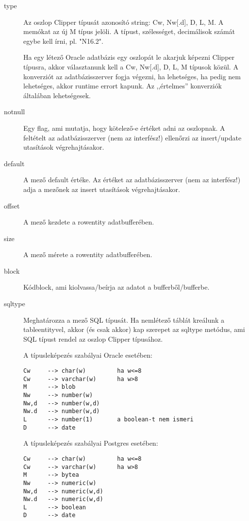 \begin{description}
\item[type]
    Az oszlop Clipper típusát azonosító string:  Cw, Nw[.d], D, L, M.
    A memókat az új M típus jelöli. A típust, szélességet, decimálisok
    számát egybe kell írni, pl. "N16.2".

    Ha egy létező Oracle adatbázis egy oszlopát le akarjuk
    képezni Clipper típusra, akkor választanunk kell a 
    Cw, Nw[.d], D, L, M típusok közül. A konverziót az adatbázisszerver
    fogja végezni, ha lehetséges, ha pedig nem lehetséges, 
    akkor runtime errort kapunk. Az ,,értelmes'' konverziók általában 
    lehetségesek.

\item[notnull]
    Egy flag, ami mutatja, hogy kötelező-e értéket adni az oszlopnak.
    A feltételt az adatbázisszerver (nem az interfész!)
    ellenőrzi az insert/update utasítások végrehajtásakor.
\item[default]
    A mező default értéke. Az értéket az adatbázisszerver 
    (nem az interfész!)
    adja a mezőnek az insert utasítások  végrehajtásakor.
\item[offset]
    A mező kezdete a rowentity adatbufferében.
\item[size] 
    A mező mérete a rowentity adatbufferében.
\item[block] 
    Kódblock, ami kiolvassa/beírja az adatot a bufferből/bufferbe.
\item[sqltype]
    Meghatározza a mező SQL típusát.
    Ha nemlétező táblát kreálunk a tableentityvel, 
    akkor (és csak akkor) kap szerepet az sqltype metódus, 
    ami SQL típust rendel az oszlop Clipper típusához.

    A típusleképezés szabályai Oracle esetében:

\begin{verbatim}
Cw     --> char(w)         ha w<=8
Cw     --> varchar(w)      ha w>8
M      --> blob
Nw     --> number(w)
Nw,d   --> number(w,d)  
Nw.d   --> number(w,d)
L      --> number(1)       a boolean-t nem ismeri
D      --> date
\end{verbatim}

    A típusleképezés szabályai Postgres esetében:

\begin{verbatim}
Cw     --> char(w)         ha w<=8
Cw     --> varchar(w)      ha w>8
M      --> bytea
Nw     --> numeric(w)
Nw,d   --> numeric(w,d)  
Nw.d   --> numeric(w,d)
L      --> boolean
D      --> date
\end{verbatim}


\end{description}
